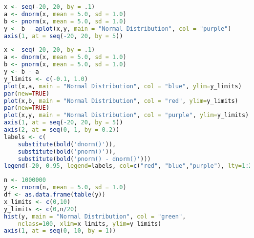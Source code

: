 \documentclass{ProgramLabCUNY}
\begin{document}
\begin{lstlisting}[language=R]
x <- seq(-20, 20, by = .1)
a <- dnorm(x, mean = 5.0, sd = 1.0)
b <- pnorm(x, mean = 5.0, sd = 1.0)
y <- b - aplot(x,y, main = "Normal Distribution", col = "purple")
axis(1, at = seq(-20, 20, by = 5))
\end{lstlisting}
\vfill
{}
\vfill


\begin{lstlisting}[language=R]
x <- seq(-20, 20, by = .1)
a <- dnorm(x, mean = 5.0, sd = 1.0)
b <- pnorm(x, mean = 5.0, sd = 1.0)
y <- b - a
y_limits <- c(-0.1, 1.0)
plot(x,a, main = "Normal Distribution", col = "blue", ylim=y_limits)
par(new=TRUE)
plot(x,b, main = "Normal Distribution", col = "red", ylim=y_limits)
par(new=TRUE)
plot(x,y, main = "Normal Distribution", col = "purple", ylim=y_limits)
axis(1, at = seq(-20, 20, by = 5))
axis(2, at = seq(0, 1, by = 0.2))
labels <- c(
    substitute(bold('dnorm()')),
    substitute(bold('pnorm()')),
    substitute(bold('pnorm() - dnorm()')))
legend(-20, 0.95, legend=labels, col=c("red", "blue","purple"), lty=1:2, cex=0.8)
\end{lstlisting}
\vfill
{}
\vfill


\begin{lstlisting}[language=R]
n <- 1000000
y <- rnorm(n, mean = 5.0, sd = 1.0)
df <- as.data.frame(table(y))
x_limits <- c(0,10)
y_limits <- c(0,n/20)
hist(y, main = "Normal Distribution", col = "green",
    nclass=100, xlim=x_limits, ylim=y_limits)
axis(1, at = seq(0, 10, by = 1))
\end{lstlisting}
\vfill
{}
\vfill
\end{document}
